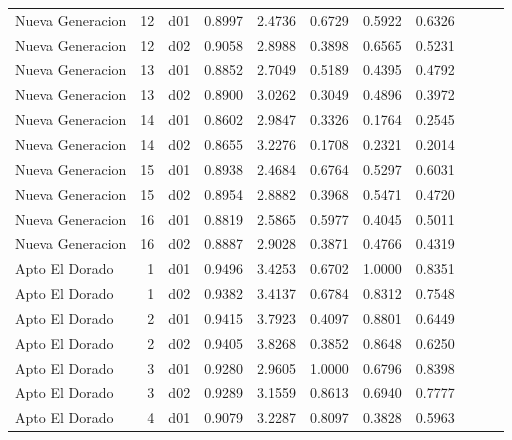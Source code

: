 \begin{landscape}
\begin{longtable}{p{2cm}rrrrrrrrrr}
        Nueva Generacion  &         12 &     d01 &   0.8997 &  2.4736 &        0.6729 &           0.5922 &  0.6326 \\
        Nueva Generacion  &         12 &     d02 &   0.9058 &  2.8988 &        0.3898 &           0.6565 &  0.5231 \\
        Nueva Generacion  &         13 &     d01 &   0.8852 &  2.7049 &        0.5189 &           0.4395 &  0.4792 \\
        Nueva Generacion  &         13 &     d02 &   0.8900 &  3.0262 &        0.3049 &           0.4896 &  0.3972 \\
        Nueva Generacion  &         14 &     d01 &   0.8602 &  2.9847 &        0.3326 &           0.1764 &  0.2545 \\
        Nueva Generacion  &         14 &     d02 &   0.8655 &  3.2276 &        0.1708 &           0.2321 &  0.2014 \\
        Nueva Generacion  &         15 &     d01 &   0.8938 &  2.4684 &        0.6764 &           0.5297 &  0.6031 \\
        Nueva Generacion  &         15 &     d02 &   0.8954 &  2.8882 &        0.3968 &           0.5471 &  0.4720 \\
        Nueva Generacion  &         16 &     d01 &   0.8819 &  2.5865 &        0.5977 &           0.4045 &  0.5011 \\
        Nueva Generacion  &         16 &     d02 &   0.8887 &  2.9028 &        0.3871 &           0.4766 &  0.4319 \\
          Apto El Dorado  &          1 &     d01 &   0.9496 &  3.4253 &        0.6702 &           1.0000 &  0.8351 \\
          Apto El Dorado  &          1 &     d02 &   0.9382 &  3.4137 &        0.6784 &           0.8312 &  0.7548 \\
          Apto El Dorado  &          2 &     d01 &   0.9415 &  3.7923 &        0.4097 &           0.8801 &  0.6449 \\
          Apto El Dorado  &          2 &     d02 &   0.9405 &  3.8268 &        0.3852 &           0.8648 &  0.6250 \\
          Apto El Dorado  &          3 &     d01 &   0.9280 &  2.9605 &        1.0000 &           0.6796 &  0.8398 \\
          Apto El Dorado  &          3 &     d02 &   0.9289 &  3.1559 &        0.8613 &           0.6940 &  0.7777 \\
          Apto El Dorado  &          4 &     d01 &   0.9079 &  3.2287 &        0.8097 &           0.3828 &  0.5963 \\

\end{longtable}
\end{landscape}
